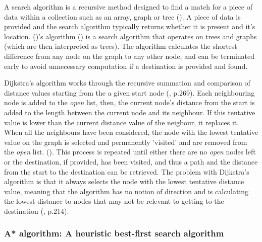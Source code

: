 \documentclass[11pt, a4paper]{article}
\begin{document}
A search algorithm is a recursive method designed to find a match for a piece of data within a collection such as an array, graph or tree (\cite{friedman1976algorithm}). A piece of data is provided and the search algorithm typically returns whether it is present and it's location. (\citeauthor{dijkstra1959note})'s algorithm (\citeyear{dijkstra1959note}) is a search algorithm that operates on trees and graphs (which are then interpreted as trees). The algorithm calculates the shortest difference from any node on the graph to any other node, and can be terminated early to avoid unnecessary computation if a destination is provided and found.

Dijkstra's algorithm works through the recursive summation and comparison of distance values starting from the a given start node (\cite{dijkstra1959note}, p.269). Each neighbouring node is added to the \emph{open} list, then, the current node's distance from the start is added to the length between the current node and its neighbour. If this tentative value is lower than the current distance value of the neigbour, it replaces it. When all the neighbours have been considered, the node with the lowest tentative value on the graph is selected and permanently 'visited' and are removed from the \emph{open} list. (\cite{dijkstra1959note}). This process is repeated until either there are no \emph{open} nodes left or the destination, if provided, has been visited, and thus a path and the distance from the start to the destination can be retrieved. The problem with Dijkstra's algorithm is that it always selects the node with the lowest tentative distance value, meaning that the algorithm has no notion of direction and is calculating the lowest distance to nodes that may not be relevant to getting to the destination (\cite{millington2019ai}, p.214).

\subsubsection{A* algorithm: A heuristic best-first search algorithm}
\end{document}
